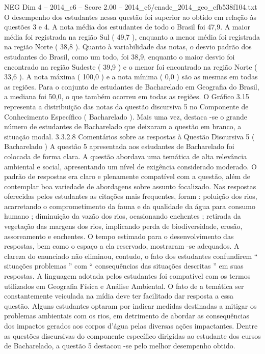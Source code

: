 \begin{textsample}{NEG Dim 4 – 2014\_c6 – Score 2.00 – 2014\_c6/enade\_2014\_geo\_cfb538f104.txt}
O desempenho dos estudantes nessa questão foi superior ao obtido em relação às questões 3 e 4.
A nota média dos estudantes de todo o Brasil foi 47,9.
A maior média foi registrada na região Sul ( 49,7 ), enquanto a menor média foi registrada na região Norte ( 38,8 ).
Quanto à variabilidade das notas, o desvio padrão dos estudantes do Brasil, como um todo, foi 38,9, enquanto o maior desvio foi encontrado na região Sudeste ( 39,9 ) e o menor foi encontrado na região Norte ( 33,6 ).
A nota máxima ( 100,0 ) e a nota mínima ( 0,0 ) são as mesmas em todas as regiões.
Para o conjunto de estudantes de Bacharelado em Geografia do Brasil, a mediana foi 50,0, o que também ocorreu em todas as regiões.
O Gráfico 3.15 representa a distribuição das notas da questão discursiva 5 no Componente de Conhecimento Específico ( Bacharelado ).
Mais uma vez, destaca -se o grande número de estudantes de Bacharelado que deixaram a questão em branco, a situação modal. 3.3.2.8 Comentários sobre as respostas à Questão Discursiva 5 ( Bacharelado ) A questão 5 apresentada aos estudantes de Bacharelado foi colocada de forma clara.
A questão abordava uma temática de alta relevância ambiental e social, apresentando um nível de exigência considerado moderado.
O padrão de respostas era claro e plenamente compatível com a questão, além de contemplar boa variedade de abordagens sobre assunto focalizado.
Nas respostas oferecidas pelos estudantes as citações mais frequentes, foram : poluição dos rios, acarretando o comprometimento da fauna e da qualidade da água para consumo humano ; diminuição da vazão dos rios, ocasionando enchentes ; retirada da vegetação das margens dos rios, implicando perda de biodiversidade, erosão, assoreamento e enchentes.
O tempo estimado para o desenvolvimento das respostas, bem como o espaço a ela reservado, mostraram -se adequados.
A clareza do enunciado não eliminou, contudo, o fato dos estudantes confundirem “ situações problemas ” com “ consequências das situações descritas ” em suas respostas.
A linguagem adotada pelos estudantes foi compatível com os termos utilizados em Geografia Física e Análise Ambiental.
O fato de a temática ser constantemente veiculada na mídia deve ter facilitado dar resposta a essa questão.
Alguns estudantes optaram por indicar medidas destinadas a mitigar os problemas ambientais com os rios, em detrimento de abordar as consequências dos impactos gerados aos corpos d'água pelas diversas ações impactantes.
Dentre as questões discursivas do componente específico dirigidas ao estudante dos cursos de Bacharelado, a questão 5 destacou -se pelo melhor desempenho obtido.

\end{textsample}
